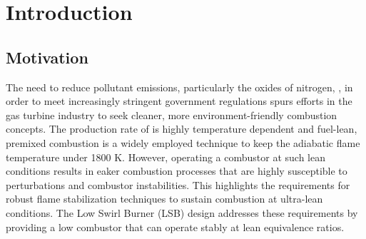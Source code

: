 \chapter{Introduction}
\label{ch:introduction}






\section{Motivation}

The need to reduce pollutant emissions, particularly the oxides of nitrogen, , in order to meet increasingly stringent government regulations spurs efforts in the gas turbine industry to seek cleaner, more environment-friendly combustion concepts.
The production rate of  is highly temperature dependent and fuel-lean, premixed combustion is a widely employed technique to keep the adiabatic flame temperature under 1800 K.
However, operating a combustor at such lean conditions results in eaker combustion processes that are highly susceptible to perturbations and combustor instabilities.
This highlights the requirements for robust flame stabilization techniques to sustain combustion at ultra-lean conditions.
The Low Swirl Burner (LSB) design addresses these requirements by providing a low  combustor that can operate stably at lean equivalence ratios.


